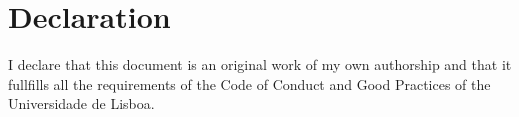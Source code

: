 
\section*{Declaration}

I declare that this document is an original work of my own authorship and that it fullfills all the requirements of the Code of Conduct and Good Practices of the Universidade de Lisboa.
